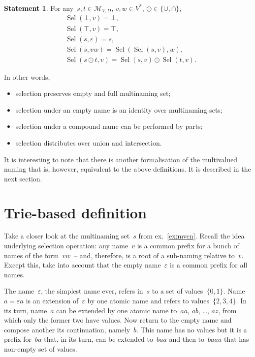 \documentclass{article}
\theoremstyle{definition}
\newtheorem{St}{Statement}
\newcommand{\setcharmvcn}{M}
\newcommand{\setsymbol}[3]{\mathcal{#1}_{#2,#3}}
\newcommand{\setmvcn}[2]{\setsymbol{\setcharmvcn}{#1}{#2}}
\newcommand{\select}{\operatorname{Sel}}
\begin{document}
\begin{St}\label{st:mvcn-selection-properties}
For any~$s,t\in\setmvcn{V}{D}$, $v, w\in V^\ast$, $\odot\in\{\cup, \cap\}$,
\begin{eqnarray*}
  & \select(\bot,v) = \bot, \\
  & \select(\top,v) = \top, \\
  & \select(s,\varepsilon) = s, \\
  & \select(s,vw) = \select(\select(s,v), w), \\
  & \select(s\odot t, v) = \select(s,v)\odot \select(t,v).
\end{eqnarray*}
\end{St}
In other words,
\begin{itemize}
\item selection preserves empty and full multinaming set;
\item selection under an empty name is an identity over multinaming sets;
\item selection under a compound name can be performed by parts;
\item selection distributes over union and intersection.
\end{itemize}

It is interesting to note that there is another formalisation of the
multivalued naming that is, however, equivalent to the above definitions.  It
is described in the next section.



\section{Trie-based definition}

Take a closer look at the multinaming set~$s$ from ex.~\ref{ex:mvcn}.  Recall
the idea underlying selection operation: any name~$v$ is a common prefix for a
bunch of names of the form~$vw$~-- and, therefore, is a root of a sub-naming
relative to~$v$. Except this, take into account that the empty
name~$\varepsilon$ is a common prefix for all names.

The name~$\varepsilon$, the simplest name ever, refers in~$s$ to a set of
values~$\{0,1\}$. Name~$a=\varepsilon a$ is an extension of~$\varepsilon$ by
one atomic name and refers to values~$\{2,3,4\}$. In its turn, name~$a$ can be
extended by one atomic name to~$aa$, $ab$, \ldots, $az$, from which only the
former two have values.  Now return to the empty name and compose another its
continuation, namely~$b$.  This name has no values but it is a prefix for~$ba$
that, in its turn, can be extended to~$baa$ and then to~$baaa$ that has
non-empty set of values.
\end{document}
